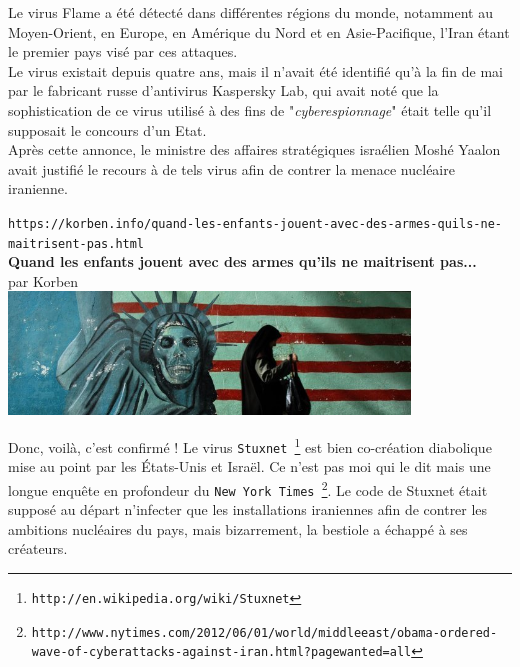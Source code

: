 \documentclass[11pt,twoside,a4paper]{article}
\begin{document}
Le virus Flame a {\'e}t{\'e} d{\'e}tect{\'e} dans diff{\'e}rentes r{\'e}gions du monde, notamment au Moyen-Orient, en Europe, en Am{\'e}rique du Nord et en Asie-Pacifique, l'Iran {\'e}tant le premier pays vis{\'e} par ces attaques.~\\

Le virus existait depuis quatre ans, mais il n'avait {\'e}t{\'e} identifi{\'e} qu'{\`a} la fin de mai par le fabricant russe d'antivirus Kaspersky Lab, qui avait not{\'e} que la sophistication de ce virus utilis{\'e} {\`a} des fins de "\emph{cyberespionnage}" {\'e}tait telle qu'il supposait le concours d'un Etat.~\\

Apr{\`e}s cette annonce, le ministre des affaires strat{\'e}giques isra{\'e}lien Mosh{\'e} Yaalon avait justifi{\'e} le recours {\`a} de tels virus afin de contrer la menace nucl{\'e}aire iranienne. %

\clearpage

\texttt{https://korben.info/quand-les-enfants-jouent-avec-des-armes-quils-ne-maitrisent-pas.html}~\\

\textbf{\LARGE Quand les enfants jouent avec des armes qu'ils ne maitrisent pas...}~\\

par Korben~\\

\includegraphics[width=0.80\textwidth]{img/capture05072008115135bm6.jpg}

Donc, voil{\`a}, c'est confirm{\'e} ! Le virus \texttt{Stuxnet~\footnote{\texttt{http://en.wikipedia.org/wiki/Stuxnet}}} est bien co-cr{\'e}ation diabolique mise au point par les {\'E}tats-Unis et Isra{\"e}l. Ce n'est pas moi qui le dit mais une longue enqu{\^e}te en profondeur du \texttt{New York Times~\footnote{\texttt{http://www.nytimes.com/2012/06/01/world/middleeast/obama-ordered-wave-of-cyberattacks-against-iran.html?pagewanted=all}}}. Le code de Stuxnet {\'e}tait suppos{\'e} au d{\'e}part n'infecter que les installations iraniennes afin de contrer les ambitions nucl{\'e}aires du pays, mais bizarrement, la bestiole a {\'e}chapp{\'e} {\`a} ses cr{\'e}ateurs.~\\
\end{document}
